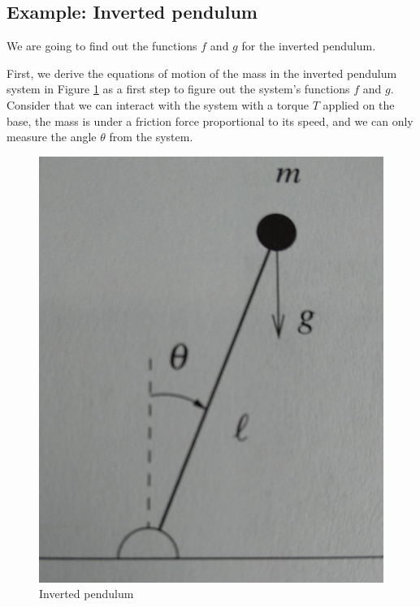 \documentclass[11pt,a4paper,titlepage]{article}
\begin{document}
\subsection{Example: Inverted pendulum}

We are going to find out the functions $f$ and $g$ for the inverted pendulum.

First, we derive the equations of motion of the mass in the inverted pendulum system in Figure \ref{fig: invpen} as a first step to figure out the system's functions $f$ and $g$. Consider that we can interact with the system with a torque $T$ applied on the base, the mass is under a friction force proportional to its speed, and we can only measure the angle $\theta$ from the system.

\begin{figure}[!h]
\centering
	\includegraphics[scale=0.1]{./invpen.png}
	\caption{Inverted pendulum}
	\label{fig: invpen}
\end{figure}
\end{document}
